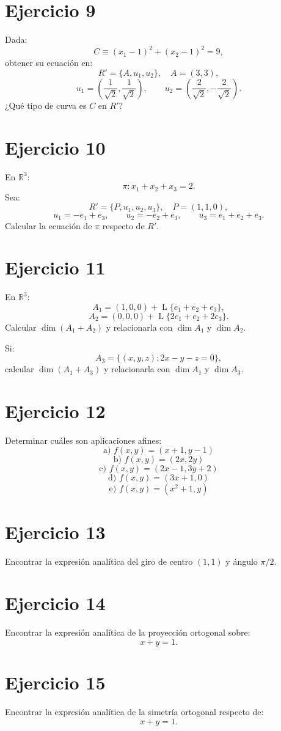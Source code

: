 \documentclass[11pt,a4paper]{article}
\newcommand{\R}{\mathbb{R}}
\newcommand{\Span}{\operatorname{L}}
\begin{document}
\section{Ejercicio 9}
Dada:
\[
C\equiv(x_1-1)^2+(x_2-1)^2=9,
\]
obtener su ecuación en:
\[
R'=\{A,u_1,u_2\},
\quad
A=(3,3),
\]
\[
u_1=\left(\frac1{\sqrt2},\frac1{\sqrt2}\right),
\qquad
u_2=\left(\frac2{\sqrt2},-\frac2{\sqrt2}\right).
\]
¿Qué tipo de curva es $C$ en $R'$?

\section{Ejercicio 10}
En $\R^3$:
\[
\pi:x_1+x_2+x_3=2.
\]
Sea:
\[
R'=\{P,u_1,u_2,u_3\},
\quad
P=(1,1,0),
\]
\[
u_1=-e_1+e_3,\qquad
u_2=-e_2+e_3,\qquad
u_3=e_1+e_2+e_3.
\]
Calcular la ecuación de $\pi$ respecto de $R'$.

\section{Ejercicio 11}
En $\R^3$:
\[
A_1=(1,0,0)+\Span\{e_1+e_2+e_3\},
\]
\[
A_2=(0,0,0)+\Span\{2e_1+e_2+2e_3\}.
\]
Calcular $\dim(A_1+A_2)$ y relacionarla con $\dim A_1$ y $\dim A_2$.

Si:
\[
A_3=\{(x,y,z):2x-y-z=0\},
\]
calcular $\dim(A_1+A_3)$ y relacionarla con $\dim A_1$ y $\dim A_3$.

\section{Ejercicio 12}
Determinar cuáles son aplicaciones afines:
\[
\text{a) }f(x,y)=(x+1,y-1)
\]
\[
\text{b) }f(x,y)=(2x,2y)
\]
\[
\text{c) }f(x,y)=(2x-1,3y+2)
\]
\[
\text{d) }f(x,y)=(3x+1,0)
\]
\[
\text{e) }f(x,y)=(x^2+1,y)
\]

\section{Ejercicio 13}
Encontrar la expresión analítica del giro de centro $(1,1)$ y ángulo $\pi/2$.

\section{Ejercicio 14}
Encontrar la expresión analítica de la proyección ortogonal sobre:
\[
x+y=1.
\]

\section{Ejercicio 15}
Encontrar la expresión analítica de la simetría ortogonal respecto de:
\[
x+y=1.
\]
\end{document}
